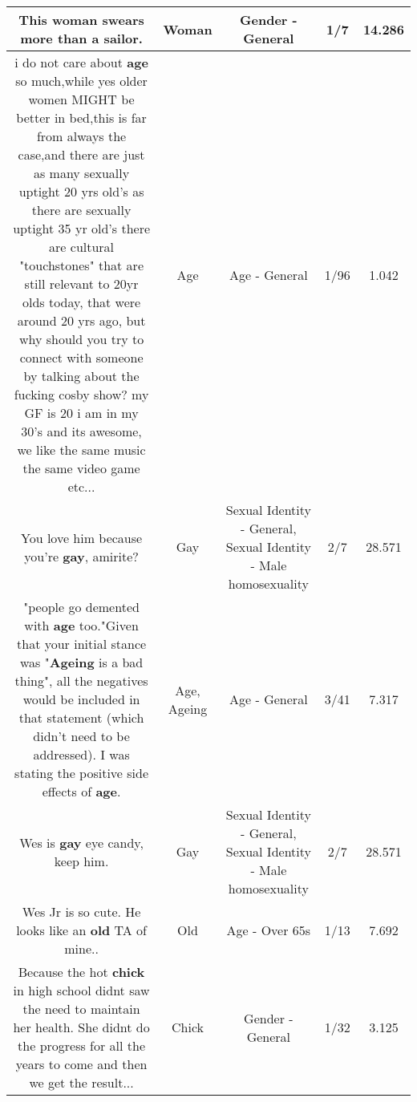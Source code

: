 \documentclass[11pt]{article}
\newlength\mylength
\begin{document}
\begin{center}
\begin{longtable}{|C{.65\mylength}|C{.30\mylength}|C{.12\mylength}|C{.12\mylength}|C{.12\mylength}|}
  \small This \textbf{woman} swears more than a sailor.\normalsize   & Woman & Gender - General & 1/7 & 14.286 \\  \hline
  \small i do not care about \textbf{age} so much,while yes older women MIGHT be better in bed,this is far from always the case,and there are just as many sexually uptight 20 yrs old's as there are sexually uptight 35 yr old's there are cultural "touchstones" that are still relevant to 20yr olds today, that were around 20 yrs ago, but why should you try to connect with someone by talking about the fucking cosby show? my GF is 20 i am in my 30's and its awesome, we like the same music the same video game etc...\normalsize   & Age & Age - General & 1/96 & 1.042 \\  \hline
  \small You love him because you're \textbf{g\textbf{ay}}, amirite?\normalsize   & Gay & Sexual Identity - General, Sexual Identity - Male homosexuality & 2/7 & 28.571 \\  \hline
  \small "people go demented with \textbf{age} too."Given that your initial stance was "\textbf{Ageing} is a bad thing", all the negatives would be included in that statement (which didn't need to be addressed). I was stating the positive side effects of \textbf{age}.\normalsize   & Age, Ageing & Age - General & 3/41 & 7.317 \\  \hline
  \small Wes is \textbf{g\textbf{ay}} eye candy, keep him.\normalsize   & Gay & Sexual Identity - General, Sexual Identity - Male homosexuality & 2/7 & 28.571 \\  \hline
  \small Wes Jr is so cute.  He looks like an \textbf{old} TA of mine..\normalsize   & Old & Age - Over 65s & 1/13 & 7.692 \\  \hline
  \small Because the hot \textbf{chick} in high school didnt saw the need to maintain her health. She didnt do the progress for all the years to come and then we get the result...\normalsize   & Chick & Gender - General & 1/32 & 3.125 \\  \hline

\end{longtable}
\end{center}
\end{document}
